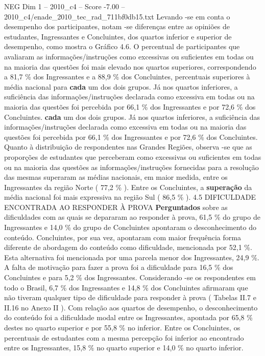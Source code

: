 \begin{textsample}{NEG Dim 1 – 2010\_c4 – Score -7.00 – 2010\_c4/enade\_2010\_tec\_rad\_711bf0db15.txt}
Levando -se em conta o desempenho dos participantes, notam -se diferenças entre as opiniões de estudantes, Ingressantes e Concluintes, dos quartos inferior e superior de desempenho, como mostra o Gráfico 4.6.
O percentual de participantes que avaliaram as informações/instruções como excessivas ou suficientes em todas ou na maioria das questões foi mais elevado nos quartos superiores, correspondendo a 81,7 \% dos Ingressantes e a 88,9 \% dos Concluintes, percentuais superiores à média nacional para \textbf{cada} um dos dois grupos.
Já nos quartos inferiores, a suficiência das informações/instruções declarada como excessiva em todas ou na maioria das questões foi percebida por 66,1 \% dos Ingressantes e por 72,6 \% dos Concluintes. \textbf{cada} um dos dois grupos.
Já nos quartos inferiores, a suficiência das informações/instruções declarada como excessiva em todas ou na maioria das questões foi percebida por 66,1 \% dos Ingressantes e por 72,6 \% dos Concluintes.
Quanto à distribuição de respondentes nas Grandes Regiões, observa -se que as proporções de estudantes que perceberam como excessivas ou suficientes em todas ou na maioria das questões as informações/instruções fornecidas para a resolução das mesmas superaram as médias nacionais, em maior medida, entre os Ingressantes da região Norte ( 77,2 \% ).
Entre os Concluintes, a \textbf{superação} da média nacional foi mais expressiva na região Sul ( 86,5 \% ). 4.5 DIFICULDADE ENCONTRADA AO RESPONDER À PROVA \textbf{Perguntados} sobre as dificuldades com as quais se depararam ao responder à prova, 61,5 \% do grupo de Ingressantes e 14,0 \% do grupo de Concluintes apontaram o desconhecimento do conteúdo.
Concluintes, por sua vez, apontaram com maior frequência forma diferente de abordagem do conteúdo como dificuldade, mencionada por 52,1 \%.
Esta alternativa foi mencionada por uma parcela menor dos Ingressantes, 24,9 \%.
A falta de motivação para fazer a prova foi a dificuldade para 16,5 \% dos Concluintes e para 5,2 \% dos Ingressantes.
Considerando -se os respondentes em todo o Brasil, 6,7 \% dos Ingressantes e 14,8 \% dos Concluintes afirmaram que não tiveram qualquer tipo de dificuldade para responder à prova ( Tabelas II.7 e II.16 no Anexo II ).
Com relação aos quartos de desempenho, o desconhecimento do conteúdo foi a dificuldade modal entre os Ingressantes, apontada por 65,8 \% destes no quarto superior e por 55,8 \% no inferior.
Entre os Concluintes, os percentuais de estudantes com a mesma percepção foi inferior ao encontrado entre os Ingressantes, 15,8 \% no quarto superior e 14,0 \% no quarto inferior.

\end{textsample}
